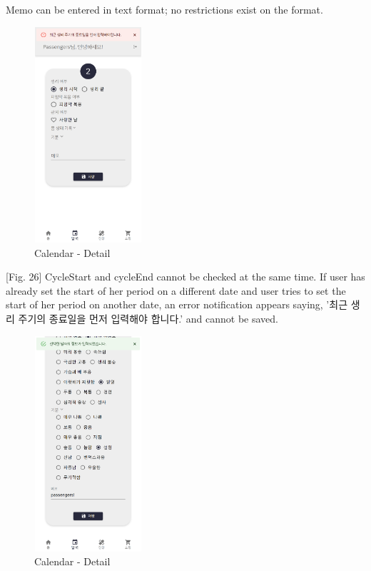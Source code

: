 \documentclass[conference]{IEEEtran}
\begin{document}
\begin{itemize}
\begin{enumerate}
        [Fig. 25] Memo can be entered in text format; no restrictions exist on the format.
        
        \begin{figure}[ht]
        \includegraphics[width=4cm, height=8cm, center]{calendar_detail6.png}
        \caption{Calendar - Detail}
        \label{fig26}
        \end{figure}
        
        [Fig. 26] CycleStart and cycleEnd cannot be checked at the same time. 
        If user has already set the start of her period on a different date and user tries to set the start of her period on another date, an error notification appears saying, '최근 생리 주기의 종료일을 먼저 입력해야 합니다.' and cannot be saved. 
        
        \begin{figure}[ht]
        \includegraphics[width=4cm, height=8cm, center]{calendar_detail7.png}
        \caption{Calendar - Detail}
        \label{fig27}
        \end{figure}


\end{enumerate}
\end{itemize}
\end{document}
